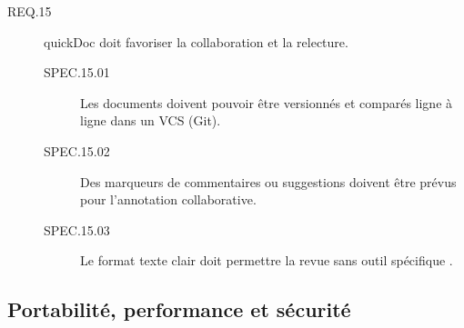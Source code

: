 \documentclass[a4paper,12pt]{article}
\begin{document}
\begin{description}
\item[{\label{org263e509}REQ.15}] quickDoc doit favoriser la collaboration et la relecture.
\begin{description}
\item[{\label{orgea8f3ad}SPEC.15.01}] Les documents doivent pouvoir être versionnés et comparés ligne à ligne dans un VCS (Git).
\item[{\label{orgb38f1d4}SPEC.15.02}] Des marqueurs de commentaires ou suggestions doivent être prévus pour l’annotation collaborative.
\item[{\label{orgea2e114}SPEC.15.03}] Le format texte clair doit permettre la revue sans outil spécifique \autocite{bleielCollaboratingGitHub2016,liuHowReadMeFiles2022}.
\end{description}
\end{description}
\subsection{Portabilité, performance et sécurité}
\label{sec:orga2599db}
\end{document}

